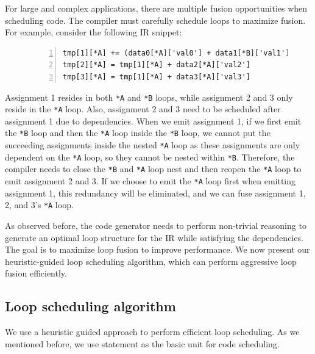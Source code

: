 \documentclass[sigplan, nonacm]{acmart}\settopmatter{printfolios=true,printccs=false,printacmref=false}
\begin{document}
For large and complex applications, there are multiple fusion opportunities when scheduling code. The compiler must carefully schedule loops to maximize fusion. For example, consider the following IR snippet:\par
\begin{figure}[H]
\begin{lstlisting}[numbers=left]
tmp[1][*A] += (data0[*A]['val0'] + data1[*B]['val1'])
tmp[2][*A] = tmp[1][*A] + data2[*A]['val2']
tmp[3][*A] = tmp[1][*A] + data3[*A]['val3']
\end{lstlisting}
\caption{}
\label{loopheu}
\end{figure}
Assignment 1 resides in both \texttt{*A} and \texttt{*B} loops, while assignment 2 and 3 only reside in the \texttt{*A} loop. Also, assignment 2 and 3 need to be scheduled after assignment 1 due to dependencies. When we emit assignment 1, if we first emit the \texttt{*B} loop and then the \texttt{*A} loop inside the \texttt{*B} loop, we cannot put the succeeding assignments inside the nested \texttt{*A} loop as these assignments are only dependent on the \texttt{*A} loop, so they cannot be nested within \texttt{*B}. Therefore, the compiler needs to close the \texttt{*B} and \texttt{*A} loop nest and then reopen the \texttt{*A} loop to emit assignment 2 and 3. If we choose to emit the \texttt{*A} loop first when emitting assignment 1, this redundancy will be eliminated, and we can fuse assignment 1, 2, and 3's \texttt{*A} loop.

As observed before, the code generator needs to perform non-trivial reasoning to generate an optimal loop structure for the IR while satisfying the dependencies. The goal is to maximize loop fusion to improve performance. We now present our heuristic-guided loop scheduling algorithm, which can perform aggressive loop fusion efficiently.
\subsection*{Loop scheduling algorithm}
\iffalse
We use a heuristic guided approach to perform efficient loop scheduling. As we mentioned before, we use statement as the basic unit for code scheduling. \par
\end{document}
